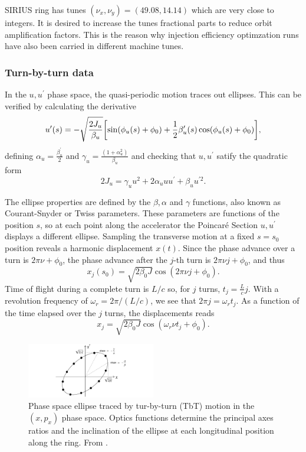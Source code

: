 SIRIUS ring has tunes $(\nu_x, \nu_y)=(49.08, 14.14)$ which are very close to integers. It is desired to increase the tunes fractional parts to reduce orbit amplification factors. This is the reason why injection efficiency optimzation runs have also been carried in different machine tunes.
\subsubsection{Turn-by-turn data}
In the $u, u^\prime$ phase space, the quasi-periodic motion traces out ellipses. This can be verified by calculating the derivative
    \begin{equation}
        u^{\prime}(s) = - \sqrt{\frac{2J_u}{\beta_u}}\qty[\sin(\phi_u(s) + \phi_0) + \frac{1}{2}\beta_u^\prime(s)\cos(\phi_u(s) + \phi_0)],
    \end{equation}
    defining $\alpha_u = \frac{\beta_u^\prime}{2}$  and $\gamma_u = \frac{(1+\alpha_u^2)}{\beta_u}$ and checking that $u, u^\prime$ satify the quadratic form
    \begin{equation}
        2J_u=\gamma_u u^{2}+2\alpha_u u u^{\prime}+\beta_u u^{\prime2}.
     \end{equation}

The ellipse properties are defined by the $\beta, \alpha$ and $\gamma$ functions, also known as Courant-Snyder or Twiss parameters. These parameters are functions of the position $s$, so at each point along the accelerator the Poincaré Section $u, u^\prime$ displays a different ellipse.
Sampling the transverse motion at a fixed $s=s_0$ position reveals a harmonic displacement $x(t)$. Since the phase advance over a turn is $2\pi \nu+\phi_0$, the phase advance after the $j$-th turn is $2\pi\nu j+\phi_0$, and thus
\begin{equation}
    x_j(s_0)=\sqrt{2\beta_0 J}\cos(2\pi\nu j+\phi_0).
\end{equation}
Time of flight during a complete turn is $L/c$ so, for $j$ turns, $t_j=\frac{L}{c} j$. With a revolution frequency of $\omega_r=2\pi/(L/c)$, we see that $2\pi j= \omega_r t_j$. As a function of the time elapsed over the $j$ turns, the displacements reads
\begin{equation}
    x_j=\sqrt{2\beta_0J}\cos(\omega_r\nu t_j+\phi_0).
\end{equation}
\begin{figure}[htb]
    \centering
    \includegraphics[width=0.5\textwidth]{Images/ellipse}
    \caption{Phase space ellipse traced by tur-by-turn (TbT) motion in the $(x,p_x)$ phase space. Optics functions determine the principal axes ratios and the inclination of the ellipse at each longitudinal position along the ring. From \cite{wolski2014beam}.}
    \label{ellipse}
\end{figure}

